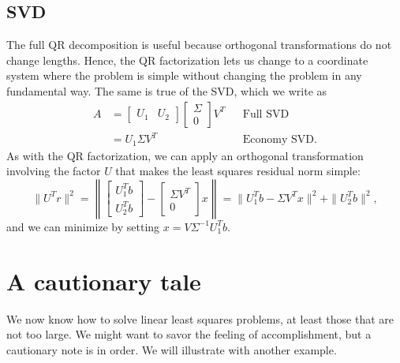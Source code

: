 \documentclass[12pt, leqno]{article} %
\begin{document}
\subsection{SVD}

The full QR decomposition is useful because orthogonal transformations
do not change lengths.  Hence, the QR factorization lets us change
to a coordinate system where the problem is simple without changing
the problem in any fundamental way.  The same is true of the SVD,
which we write as
\begin{align*}
A &=
\begin{bmatrix} U_1 & U_2 \end{bmatrix}
\begin{bmatrix} \Sigma \\ 0 \end{bmatrix}
V^T & & \mbox{Full SVD} \\
&= U_1 \Sigma V^T & & \mbox{Economy SVD}.
\end{align*}
As with the QR factorization, we can apply an orthogonal
transformation involving the factor $U$ that makes the
least squares residual norm simple:
\[
\|U^T r\|^2 =
\left\| \begin{bmatrix} U_1^T b \\ U_2^T b \end{bmatrix} -
\begin{bmatrix} \Sigma V^T \\ 0 \end{bmatrix} x
\right\| =
\|U_1^T b - \Sigma V^T x\|^2 + \|U_2^T b\|^2,
\]
and we can minimize by setting $x = V \Sigma^{-1} U_1^T b$.

\section{A cautionary tale}

We now know how to solve linear least squares problems, at least those
that are not too large.  We might want to savor the feeling of
accomplishment, but a cautionary note is in order.  We will illustrate
with another example.
\end{document}
